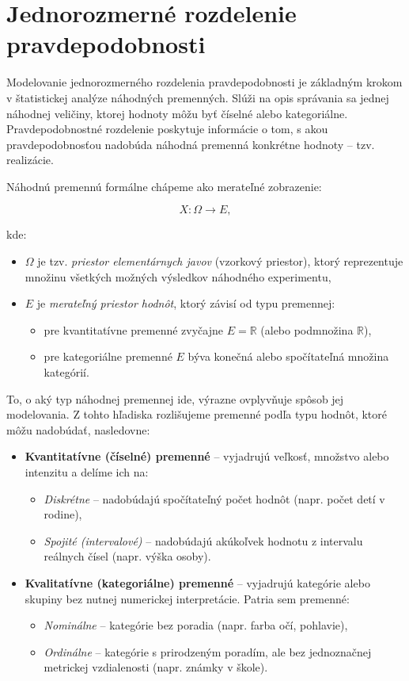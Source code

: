 \section{Jednorozmerné rozdelenie pravdepodobnosti}\label{sec:1D_modelovanie}

Modelovanie jednorozmerného rozdelenia pravdepodobnosti je základným krokom v štatistickej analýze náhodných premenných. Slúži na opis správania sa jednej náhodnej veličiny, ktorej hodnoty môžu byť číselné alebo kategoriálne. Pravdepodobnostné rozdelenie poskytuje informácie o tom, s akou pravdepodobnosťou nadobúda náhodná premenná konkrétne hodnoty – tzv. realizácie.

Náhodnú premennú formálne chápeme ako merateľné zobrazenie:

\begin{equation}
X : \Omega \to E,
\end{equation}

kde:
\begin{itemize}
  \item $\Omega$ je tzv. \textit{priestor elementárnych javov} (vzorkový priestor), ktorý reprezentuje množinu všetkých možných výsledkov náhodného experimentu,
  \item $E$ je \textit{merateľný priestor hodnôt}, ktorý závisí od typu premennej:
  \begin{itemize}
    \item pre kvantitatívne premenné zvyčajne $E = \mathbb{R}$ (alebo podmnožina $\mathbb{R}$),
    \item pre kategoriálne premenné $E$ býva konečná alebo spočítateľná množina kategórií.
  \end{itemize}
\end{itemize}

To, o aký typ náhodnej premennej ide, výrazne ovplyvňuje spôsob jej modelovania. Z tohto hľadiska rozlišujeme premenné podľa typu hodnôt, ktoré môžu nadobúdať, nasledovne:

\begin{itemize}
  \item \textbf{Kvantitatívne (číselné) premenné} – vyjadrujú veľkosť, množstvo alebo intenzitu a delíme ich na:
  \begin{itemize}
    \item \textit{Diskrétne} – nadobúdajú spočítateľný počet hodnôt (napr. počet detí v rodine),
    \item \textit{Spojité (intervalové)} – nadobúdajú akúkoľvek hodnotu z intervalu reálnych čísel (napr. výška osoby).
  \end{itemize}

  \item \textbf{Kvalitatívne (kategoriálne) premenné} – vyjadrujú kategórie alebo skupiny bez nutnej numerickej interpretácie. Patria sem premenné:
  \begin{itemize}
    \item \textit{Nominálne} – kategórie bez poradia (napr. farba očí, pohlavie),
    \item \textit{Ordinálne} – kategórie s prirodzeným poradím, ale bez jednoznačnej metrickej vzdialenosti (napr. známky v škole).
  \end{itemize}
\end{itemize}

